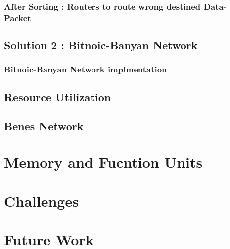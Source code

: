 \documentclass{beamer}
\begin{document}
	\subsubsection{After Sorting : Routers to route wrong destined Data-Packet}
      
	\subsection{Solution 2 : Bitnoic-Banyan Network}
    	
	\subsubsection{Bitnoic-Banyan Network implmentation}
	
      \subsection{Resource Utilization}
	  
      
  \subsection{Benes Network}

\section{Memory and Fucntion Units}
  
  
\section{Challenges}
  
  
\section{Future Work}
  
  
\end{document}
